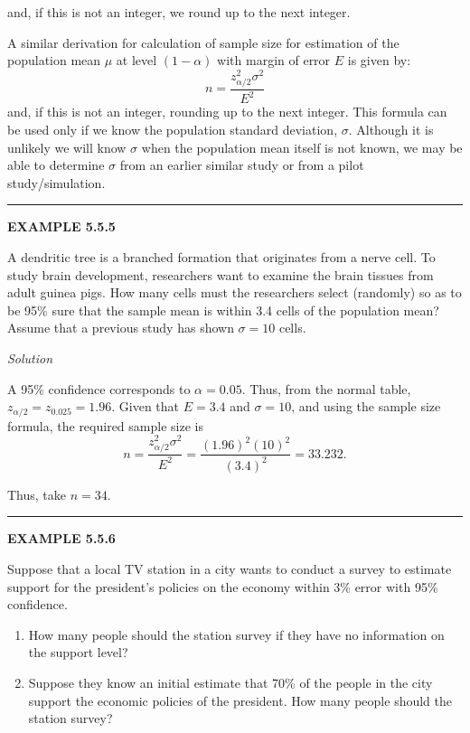 and, if this is not an integer, we round up to the next integer.

A similar derivation for calculation of sample size for estimation of the population mean $\mu$ at level $(1 - \alpha)$ with margin of error $E$ is given by:
\[
n = \frac{z_{\alpha/2}^2 \sigma^2}{E^2}
\]
and, if this is not an integer, rounding up to the next integer. This formula can be used only if we know the population standard deviation, $\sigma$. Although it is unlikely we will know $\sigma$ when the population mean itself is not known, we may be able to determine $\sigma$ from an earlier similar study or from a pilot study/simulation.

\begin{center}\rule{\linewidth}{0.4pt}\end{center}

\noindent\textbf{EXAMPLE 5.5.5}

A dendritic tree is a branched formation that originates from a nerve cell. To study brain development, researchers want to examine the brain tissues from adult guinea pigs. How many cells must the researchers select (randomly) so as to be 95\% sure that the sample mean is within 3.4 cells of the population mean? Assume that a previous study has shown $\sigma = 10$ cells.

\noindent\textit{Solution}

A 95\% confidence corresponds to $\alpha = 0.05$. Thus, from the normal table, $z_{\alpha/2} = z_{0.025} = 1.96$. Given that $E = 3.4$ and $\sigma = 10$, and using the sample size formula, the required sample size is
\[
n = \frac{z_{\alpha/2}^2 \sigma^2}{E^2} = \frac{(1.96)^2 (10)^2}{(3.4)^2} = 33.232.
\]

Thus, take $n = 34$.

\begin{center}\rule{\linewidth}{0.4pt}\end{center}

\noindent\textbf{EXAMPLE 5.5.6}

Suppose that a local TV station in a city wants to conduct a survey to estimate support for the president's policies on the economy within 3\% error with 95\% confidence.
\begin{enumerate}
    \item[(a)] How many people should the station survey if they have no information on the support level?
    \item[(b)] Suppose they know an initial estimate that 70\% of the people in the city support the economic policies of the president. How many people should the station survey?
\end{enumerate}

